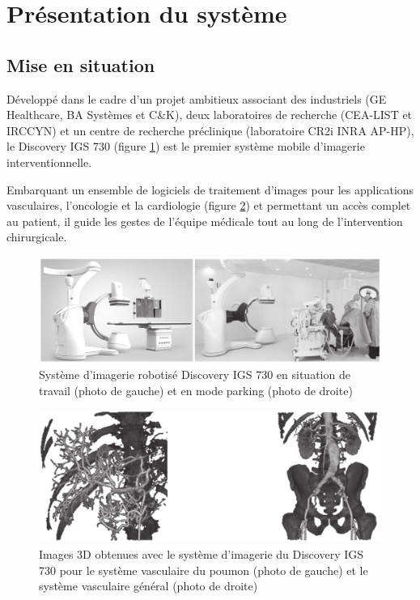

\section{Présentation du système}

\subsection{Mise en situation}

Développé dans le cadre d'un projet ambitieux associant des industriels (GE Healthcare, BA Systèmes et C\&K), deux laboratoires de recherche (CEA-LIST et IRCCYN) et un centre de recherche préclinique (laboratoire CR2i INRA AP-HP), le Discovery IGS 730 (figure \ref{fig01}) est le premier système mobile d'imagerie interventionnelle.

Embarquant un ensemble de logiciels de traitement d'images pour les applications vasculaires, l'oncologie et la cardiologie (figure \ref{fig02}) et permettant un accès complet au patient, il guide les gestes de l'équipe médicale tout au long de l'intervention chirurgicale.

\begin{figure}[ht!]
\begin{center}
 \includegraphics[width=0.7\linewidth]{img/fig01}
\end{center}
\caption{Système d'imagerie robotisé Discovery IGS 730 en situation de travail (photo de gauche) et en mode parking (photo de droite)}
\label{fig01}
\end{figure}

\vspace{-0.5cm}

\begin{figure}[ht!]
\begin{center}
 \includegraphics[width=0.7\linewidth]{img/fig02}
\end{center}
\caption{Images 3D obtenues avec le système d'imagerie du Discovery IGS 730 pour le système vasculaire du poumon (photo de gauche) et le système vasculaire général (photo de droite)}
\label{fig02}
\end{figure}

